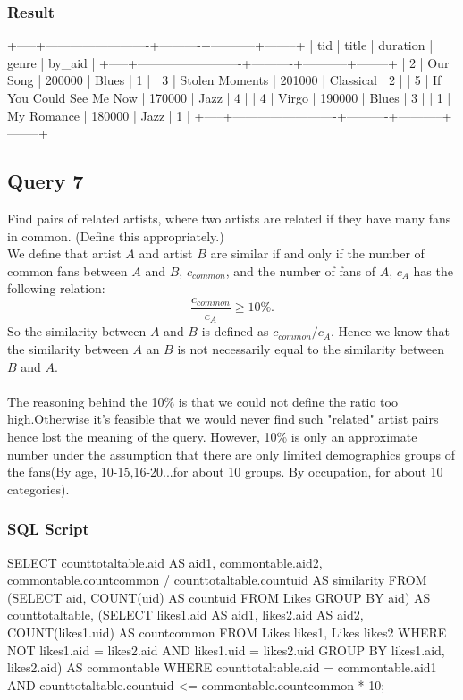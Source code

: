 \documentclass[letterpaper, 12pt]{report}
\begin{document}
	\subsubsection{Result}
	\begin{spverbatim}
		+-----+-------------------------+----------+-----------+--------+
		| tid | title                   | duration | genre     | by_aid |
		+-----+-------------------------+----------+-----------+--------+
		|   2 | Our Song                |   200000 | Blues     |      1 |
		|   3 | Stolen Moments          |   201000 | Classical |      2 |
		|   5 | If You Could See Me Now |   170000 | Jazz      |      4 |
		|   4 | Virgo                   |   190000 | Blues     |      3 |
		|   1 | My Romance              |   180000 | Jazz      |      1 |
		+-----+-------------------------+----------+-----------+--------+
	\end{spverbatim}
	
	\subsection{Query 7}
	Find pairs of related artists, where two artists are related if they have many fans in common. (Define
	this appropriately.)\\
	We define that artist $A$ and artist $B$ are similar if and only if the number of common fans between $A$ and $B$, $c_{common}$, and the number of fans of $A$, $c_A$ has the following relation:
	$$ \frac{c_{common}}{c_A} \geq 10\%.$$
	So the similarity between $A$ and $B$ is defined as $c_{common} / c_A$. Hence we know that the similarity between $A$ an $B$ is not necessarily equal to the similarity between $B$ and $A$.\\
	\\
	The reasoning behind the 10\% is that we could not define the ratio too high.Otherwise it's feasible that we would never find such "related" artist pairs hence lost the meaning of the query. However, 10\% is only an approximate number under the assumption that there are only limited demographics groups of the fans(By age, 10-15,16-20...for about 10 groups. By occupation, for about 10 categories).
	
	\subsubsection{SQL Script}
	\begin{spverbatim}
		SELECT counttotaltable.aid AS aid1, commontable.aid2,
		commontable.countcommon / counttotaltable.countuid AS similarity
		FROM (SELECT aid, COUNT(uid) AS countuid FROM Likes GROUP BY aid) AS counttotaltable,
		(SELECT likes1.aid AS aid1, likes2.aid AS aid2, COUNT(likes1.uid) AS countcommon
		FROM Likes likes1, Likes likes2
		WHERE NOT likes1.aid = likes2.aid
		AND likes1.uid = likes2.uid
		GROUP BY likes1.aid, likes2.aid) AS commontable
		WHERE counttotaltable.aid = commontable.aid1
		AND counttotaltable.countuid <= commontable.countcommon * 10;
	\end{spverbatim}
\end{document}
